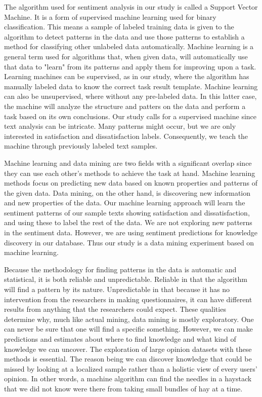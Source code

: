 \documentclass[smallextended,natbib]{svjour3}       %
\begin{document}
    The algorithm used for sentiment analysis in our study is called a Support Vector Machine. It is a form of supervised machine learning used for binary classification. This means a sample of labeled training data is given to the algorithm to detect patterns in the data and use those patterns to establish a method for classifying other unlabeled data automatically. Machine learning is a general term used for algorithms that, when given data, will automatically use that data to "learn" from its patterns and apply them for improving upon a task. Learning machines can be supervised, as in our study, where the algorithm has manually labeled data to know the correct task result template. Machine learning can also be unsupervised, where without any pre-labeled data. In this latter case, the machine will analyze the structure and patters on the data and perform a task based on its own conclusions. Our study calls for a supervised machine since text analysis can be intricate. Many patterns might occur, but we are only interested in satisfaction and dissatisfaction labels. Consequently, we teach the machine through previously labeled text samples. 

    Machine learning and data mining are two fields with a significant overlap since they can use each other's methods to achieve the task at hand. Machine learning methods focus on predicting new data based on known properties and patterns of the given data. Data mining, on the other hand, is discovering new information and new properties of the data. Our machine learning approach will learn the sentiment patterns of our sample texts showing satisfaction and dissatisfaction, and using these to label the rest of the data. We are not exploring new patterns in the sentiment data. However, we are using sentiment predictions for knowledge discovery in our database. Thus our study is a data mining experiment based on machine learning.

    Because the methodology for finding patterns in the data is automatic and statistical, it is both reliable and unpredictable. Reliable in that the algorithm will find a pattern by its nature. Unpredictable in that because it has no intervention from the researchers in making questionnaires, it can have different results from anything that the researchers could expect. These qualities determine why, much like actual mining, data mining is mostly exploratory. One can never be sure that one will find a specific something. However, we can make predictions and estimates about where to find knowledge and what kind of knowledge we can uncover. The exploration of large opinion datasets with these methods is essential. The reason being we can discover knowledge that could be missed by looking at a localized sample rather than a holistic view of every users' opinion. In other words, a machine algorithm can find the needles in a haystack that we did not know were there from taking small bundles of hay at a time.
\end{document}
